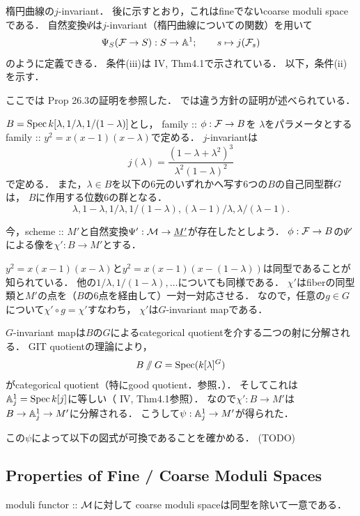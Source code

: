 \documentclass[a4paper]{jsarticle}
\begin{document}
    \begin{Example}
        楕円曲線の$j$-invariant．
        後に示すとおり，これはfineでないcoarse moduli spaceである．
        自然変換$\Psi$は$j$-invariant（楕円曲線についての関数）を用いて
        \[ \Psi_S(\mathcal{F} \to S): S \to \mathbb{A}^1; \qquad s \mapsto j(\mathcal{F}_s) \]
        のように定義できる．
        条件(iii)は\cite{HarAG} IV, Thm4.1で示されている．
        以下，条件(ii)を示す．

        ここでは\cite{HarDef} Prop 26.3の証明を参照した．
        \cite{JTev}では違う方針の証明が述べられている．
        
        $B=\operatorname{Spec} k[\lambda, 1/\lambda, 1/(1-\lambda)]$とし，
        family :: $\phi: \mathcal{F} \to B$を
        $\lambda$をパラメータとするfamily :: $y^2=x(x-1)(x-\lambda)$で定める．
        $j$-invariantは
        \[ j(\lambda)=\frac{(1-\lambda+\lambda^2)^3}{\lambda^2(1-\lambda)^2} \]
        で定める．
        また，$\lambda \in B$を以下の$6$元のいずれかへ写す$6$つの$B$の自己同型群$G$は，
        $B$に作用する位数$6$の群となる．
        \[ \lambda, 1-\lambda, 1/\lambda, 1/(1-\lambda), (\lambda-1)/\lambda, \lambda/(\lambda-1). \]

        今，scheme :: $M'$と自然変換$\Psi': \mathcal{M} \to \underline{M'}$が存在したとしよう．
        $\phi:\mathcal{F} \to B$の$\Psi'$による像を$\chi': B \to M'$とする．

        $y^2=x(x-1)(x-\lambda)$と$y^2=x(x-1)(x-(1-\lambda))$は同型であることが知られている．
        他の$1/\lambda, 1/(1-\lambda), \dots$についても同様である．
        $\chi'$はfiberの同型類と$M'$の点を（$B$の$6$点を経由して）一対一対応させる．
        なので，任意の$g \in G$について$\chi' \circ g=\chi'$すなわち，
        $\chi'$は$G$-invariant mapである．

        $G$-invariant mapは$B$の$G$によるcategorical quotientを介する二つの射に分解される．
        GIT quotientの理論により，
        \[ B \sslash G=\operatorname{Spec} (k[\lambda]^G) \]
        がcategorical quotient（特にgood quotient．\cite{Hos}参照．）．
        そしてこれは$\mathbb{A}^1_{j}=\operatorname{Spec} k[j]$に等しい（\cite{HarAG} IV, Thm4.1参照）．
        なので$\chi': B \to M'$は$B \to \mathbb{A}^1_{j} \to M'$に分解される．
        こうして$\psi: \mathbb{A}^1_{j} \to M'$が得られた．

        この$\psi$によって以下の図式が可換であることを確かめる．
        (TODO)
    \end{Example}

    \subsection{Properties of Fine / Coarse Moduli Spaces}
    \begin{Prop}
        moduli functor :: $\mathcal{M}$に対して
        coarse moduli spaceは同型を除いて一意である．
    \end{Prop}
\end{document}
